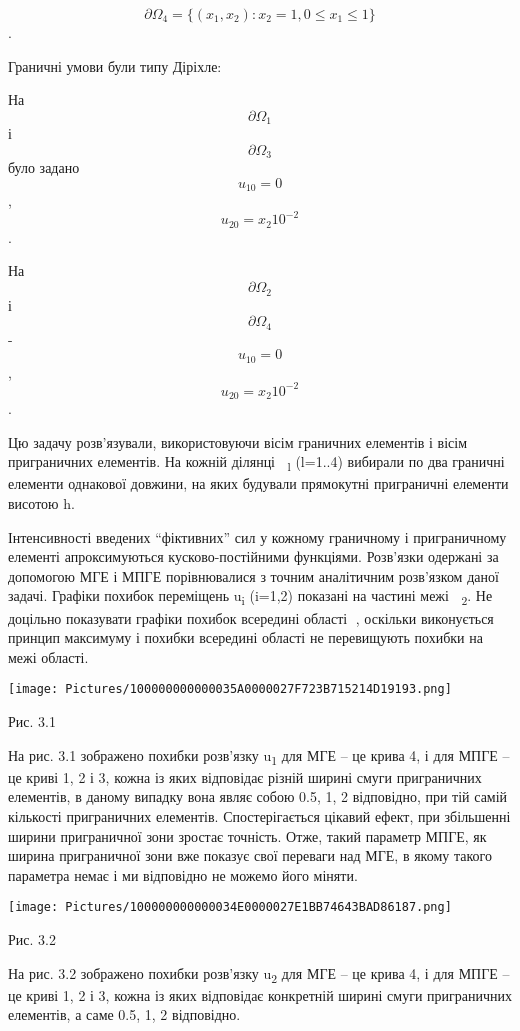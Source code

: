 \[{\partial{\Omega_{4} = {\{{(x_{1},x_{2}):{x_{2} = 1,0 \leq x_{1} \leq 1}}\}}}}{}\].

Граничні умови були типу Діріхле:

На \[{\partial\Omega_{1}}{}\]і \[{\partial\Omega_{3}}{}\]було задано
\[{u_{\text{10}} = 0}{}\],
\[{{u_{\text{20}} = x_{2}}\text{10}^{- 2}}{}\].

На \[{\partial\Omega_{2}}{}\]і \[{\partial\Omega_{4}}{}\]-
\[{u_{\text{10}} = 0}{}\],
\[{{u_{\text{20}} = x_{2}}\text{10}^{- 2}}{}\].

Цю задачу розв'язували, використовуючи вісім граничних елементів і вісім
приграничних елементів. На кожній ділянці \textsubscript{l }(l=1..4)
вибирали по два граничні елементи однакової довжини, на яких будували
прямокутні приграничні елементи висотою h.

Інтенсивності введених ``фіктивних'' сил у кожному граничному і
приграничному елементі апроксимуються кусково-постійними функціями.
Розв'язки одержані за допомогою МГЕ і МПГЕ порівнювалися з точним
аналітичним розв'язком даної задачі. Графіки похибок переміщень
u\textsubscript{i} (i=1,2) показані на частині межі \textsubscript{2}.
Не доцільно показувати графіки похибок всередині області , оскільки
виконується принцип максимуму і похибки всередині області не перевищують
похибки на межі області.

\texttt{[image: Pictures/100000000000035A0000027F723B715214D19193.png]}

Рис. 3.1

На рис. 3.1 зображено похибки розв'язку u\textsubscript{1} для МГЕ -- це
крива 4, і для МПГЕ -- це криві 1, 2 і 3, кожна із яких відповідає
різній ширині смуги приграничних елементів, в даному випадку вона являє
собою 0.5, 1, 2 відповідно, при тій самій кількості приграничних
елементів. Спостерігається цікавий ефект, при збільшенні ширини
приграничної зони зростає точність. Отже, такий параметр МПГЕ, як ширина
приграничної зони вже показує свої переваги над МГЕ, в якому такого
параметра немає і ми відповідно не можемо його міняти.

\texttt{[image: Pictures/100000000000034E0000027E1BB74643BAD86187.png]}

Рис. 3.2

На рис. 3.2 зображено похибки розв'язку u\textsubscript{2} для МГЕ -- це
крива 4, і для МПГЕ -- це криві 1, 2 і 3, кожна із яких відповідає
конкретній ширині смуги приграничних елементів, а саме 0.5, 1, 2
відповідно.

